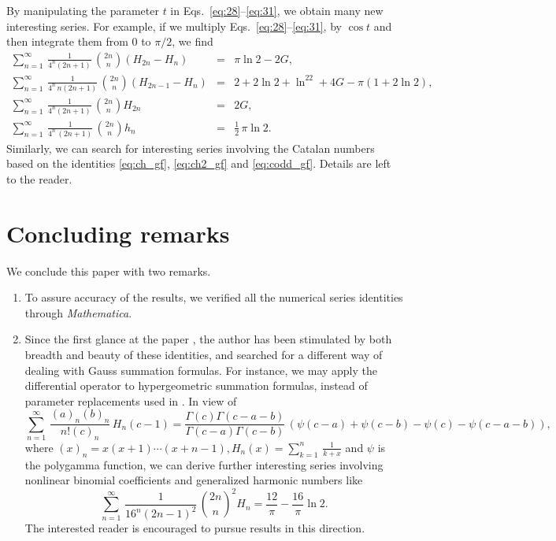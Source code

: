 \documentclass[12pt,reqno]{article}
\begin{document}
By manipulating the parameter $t$ in
Eqs.~\eqref{eq:28}--\eqref{eq:31},
we obtain many new interesting series. For example,  if we multiply
Eqs.~\eqref{eq:28}--\eqref{eq:31},
by $\cos t$ and then integrate them from $0$ to $\pi/2$, we find
\begin{eqnarray*}
\sum_{n=1}^\infty\,\frac{1}{4^n(2n+1)}\,\binom{2n}{n}(H_{2n} -H_n) & = & \pi\ln 2 - 2G,\\
\sum_{n=1}^\infty\,\frac{1}{4^n\,n(2n+1)}\,\binom{2n}{n}(H_{2n-1}-H_n) & = & 2 + 2\ln 2  +\ln^22 + 4G -\pi(1+2\ln2),\\
\sum_{n=1}^\infty\,\frac{1}{4^n(2n+1)}\,\binom{2n}{n}H_{2n} & = & 2G,\\
\sum_{n=1}^\infty\,\frac{1}{4^n\,(2n+1)}\,\binom{2n}{n}h_n & = & \frac{1}{2}\,\pi\ln 2.
\end{eqnarray*}
Similarly, we can search for interesting series involving the Catalan numbers based on the identities \eqref{eq:ch_gf}, \eqref{eq:ch2_gf} and \eqref{eq:codd_gf}. Details are left to the reader.

\section{Concluding remarks}
\label{sec4}

We conclude this paper with two remarks. 
\begin{enumerate}
\item To assure accuracy of the results, we verified all the numerical series identities through {\it Mathematica}.
\item  Since the first glance at the paper \cite{Chu}, the author has been stimulated by both breadth and beauty of these identities, and searched for a different way of dealing with Gauss summation formulas. For instance, we may apply the differential operator to hypergeometric summation formulas, instead of parameter replacements used in \cite{Chu}. In view of
$$\sum_{n=1}^\infty\,\frac{(a)_n(b)_n}{n!(c)_n}\,H_n(c-1) = \frac{\Gamma(c)\Gamma(c-a-b)}{\Gamma(c-a)\Gamma(c-b)}\,(\psi(c-a) + \psi(c-b) -\psi(c) -\psi(c-a-b)),$$
where $(x)_n = x(x+1) \cdots (x + n -1), H_n(x) = \sum_{k=1}^n\,\frac{1}{k+x}$ and $\psi$ is the polygamma function, we can derive further interesting series
involving nonlinear binomial coefficients and generalized harmonic numbers like
$$
\sum_{n=1}^\infty\,\frac{1}{16^n(2n-1)^2}\,{2n \choose n}^2 H_n = \frac{12}{\pi} - \frac{16}{\pi}\ln 2.
$$
The interested reader is encouraged to pursue results in this direction.
\end{enumerate}
\end{document}
